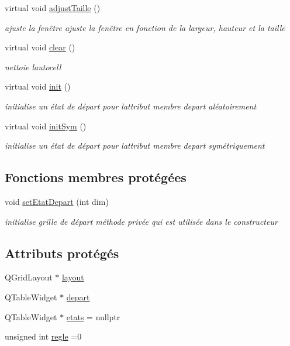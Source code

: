 \begin{DoxyCompactItemize}
virtual void \hyperlink{class_autocell1_d_ade60b5de205e8890b608baa7b7c4d186}{adjust\+Taille} ()
\begin{DoxyCompactList}\small\item\em ajuste la fenêtre ajuste la fenêtre en fonction de la largeur, hauteur et la taille \end{DoxyCompactList}\item 
virtual void \hyperlink{class_autocell1_d_a711408c00cac1a00112ce8a72eab5b48}{clear} ()
\begin{DoxyCompactList}\small\item\em nettoie l\textquotesingle{}autocell \end{DoxyCompactList}\item 
virtual void \hyperlink{class_autocell1_d_a53c95905c3b33bf49a92b64f39ec2c29}{init} ()
\begin{DoxyCompactList}\small\item\em initialise un état de départ pour l\textquotesingle{}attribut membre depart aléatoirement \end{DoxyCompactList}\item 
virtual void \hyperlink{class_autocell1_d_a5ad8a1b903cca1cce5965d22039b6e04}{init\+Sym} ()
\begin{DoxyCompactList}\small\item\em initialise un état de départ pour l\textquotesingle{}attribut membre depart symétriquement \end{DoxyCompactList}\end{DoxyCompactItemize}
\subsection*{Fonctions membres protégées}
\begin{DoxyCompactItemize}
\item 
void \hyperlink{class_autocell1_d_af7a137f43564c602e7503b34a232c4e0}{set\+Etat\+Depart} (int dim)
\begin{DoxyCompactList}\small\item\em initialise grille de départ méthode privée qui est utilisée dans le constructeur \end{DoxyCompactList}\end{DoxyCompactItemize}
\subsection*{Attributs protégés}
\begin{DoxyCompactItemize}
\item 
Q\+Grid\+Layout $\ast$ \hyperlink{class_autocell1_d_a7934db954892dc0efc12a961686a75c0}{layout}
\item 
Q\+Table\+Widget $\ast$ \hyperlink{class_autocell1_d_a7bd65a39691f86e179bcb0466e7e38c2}{depart}
\item 
Q\+Table\+Widget $\ast$ \hyperlink{class_autocell1_d_aed4038c48d9cc0a841e6f565d4cd792c}{etats} = nullptr
\item 
unsigned int \hyperlink{class_autocell1_d_ae28c4a70102bd5e08a2414d27b20bb47}{regle} =0
\end{DoxyCompactItemize}
